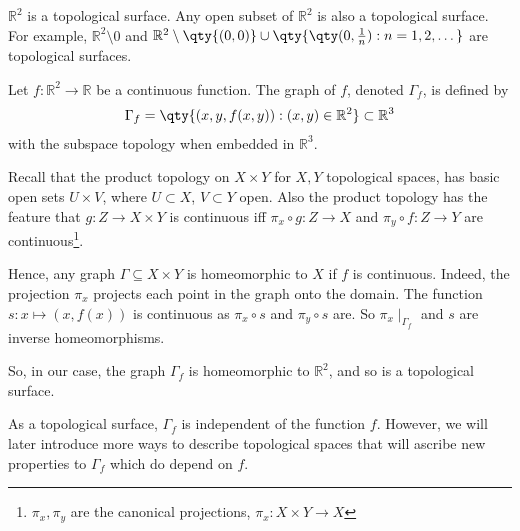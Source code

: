 \begin{example}
	$\mathbb R^2$ is a topological surface.
	Any open subset of $\mathbb R^2$ is also a topological surface.
	For example, $\mathbb R^2 \setminus \qty{0}$ and $\mathbb R^2 \setminus \qty{(0,0)} \cup \qty{\qty(0, \frac{1}{n}) : n = 1, 2, \dots}$ are topological surfaces.
\end{example}

\begin{example}
	Let $f : \mathbb R^2 \to \mathbb R$ be a continuous function.
	The graph of $f$, denoted $\Gamma_f$, is defined by
	\begin{align*}
		\Gamma_f = \qty{(x,y,f(x,y)) : (x,y) \in \mathbb R^2} \subset \mathbb{R}^3
	\end{align*}
	with the subspace topology when embedded in $\mathbb R^3$.

	Recall that the product topology on $X \times Y$ for $X, Y$ topological spaces, has basic open sets $U \times V$, where $U \subset X$, $V \subset Y$ open.
	Also the product topology has the feature that $g : Z \to X \times Y$ is continuous iff $\pi_x \circ g : Z \to X$ and $\pi_y \circ f : Z \to Y$ are continuous\footnote{$\pi_x, \pi_y$ are the canonical projections, $\pi_x : X \times Y \to X$}.

	Hence, any graph $\Gamma \subseteq X \times Y$ is homeomorphic to $X$ if $f$ is continuous.
	Indeed, the projection $\pi_x$ projects each point in the graph onto the domain.
	The function $s : x \mapsto (x,f(x))$ is continuous as $\pi_x \circ s$ and $\pi_y \circ s$ are.
	So $\pi_x \mid_{\Gamma_f}$ and $s$ are inverse homeomorphisms.

	So, in our case, the graph $\Gamma_f$ is homeomorphic to $\mathbb R^2$, and so is a topological surface.
\end{example}

\begin{remark}
	As a topological surface, $\Gamma_f$ is independent of the function $f$.
	However, we will later introduce more ways to describe topological spaces that will ascribe new properties to $\Gamma_f$ which do depend on $f$.
\end{remark}

